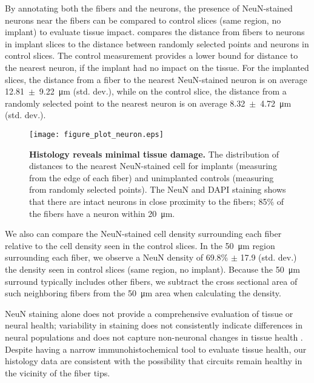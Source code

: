 By annotating both the fibers and the neurons, the presence of 
NeuN-stained neurons near the fibers can be compared to control 
slices (same region, no implant) to evaluate tissue impact. 
 compares the distance 
from fibers to neurons in implant slices to the distance 
between randomly selected points and neurons in control slices. 
The control measurement provides a lower bound for distance to 
the nearest neuron, if the implant had no impact on the tissue. 
For the implanted slices, the distance from a fiber to the nearest 
NeuN-stained neuron is on average 12.81~$\pm$~9.22~\si{\micro\meter} 
(std. dev.), while on the control slice, 
the distance from a randomly selected point to the nearest neuron 
is on average 8.32~$\pm$~4.72~\si{\micro\meter} (std. dev.).

\begin{figure}
\texttt{[image: figure\_plot\_neuron.eps]}
\caption[Distribution of distance from fiber to 
NeuN-stained cell.]{\textbf{Histology reveals minimal tissue damage.} 
The distribution of distances to the nearest NeuN-stained 
cell for implants (measuring from the edge of each fiber) 
and unimplanted controls (measuring from randomly selected 
points). The NeuN and DAPI staining shows that there are 
intact neurons in close proximity to the fibers; 
85\% of the fibers have a neuron within 20~\si{\micro\meter}.}
\label{fig:plot_neuron}
\end{figure}

We also can compare the NeuN-stained cell density surrounding each 
fiber relative to the cell density seen in the control slices. In 
the 50~\si{\micro\meter} region surrounding each fiber, we observe a NeuN density 
of 69.8\% $\pm$ 17.9 (std. dev.) the density seen in control 
slices (same region, no implant). Because the 50~\si{\micro\meter} 
surround typically includes other fibers, we subtract the cross 
sectional area of such neighboring fibers from the 50~\si{\micro\meter} 
area when calculating the density.

NeuN staining alone does not provide a comprehensive evaluation 
of tissue or neural health; variability in staining does not 
consistently indicate differences in neural populations and does 
not capture non-neuronal changes in tissue health 
\cite{UnalCevik:2004cp,Collombet:2006fj,Duan:2015iq}. Despite 
having a narrow immunohistochemical tool to evaluate tissue 
health, our histology data are consistent with the possibility 
that circuits remain healthy in the vicinity of the fiber tips.

